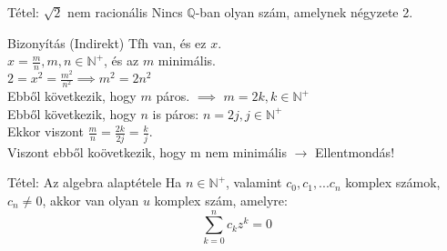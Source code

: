 \documentclass{beamer}
\begin{document}
\begin{frame}

\begin{block}{Tétel: $\sqrt{2}$ nem racionális}
Nincs $\mathbb{Q}$-ban olyan szám, amelynek négyzete 2.
\end{block}

\begin{block}{Bizonyítás (Indirekt)}
Tfh van, és ez $x$.\\
$x = \frac{m}{n}, m,n \in \mathbb{N}^+$, és az $m$ minimális.\\
$2 = x^2 = \frac{m^2}{n^2} \implies m^2 = 2n^2$\\
Ebből következik, hogy $m$ páros. $\implies$ $m = 2k, k \in \mathbb{N}^+$\\
Ebből következik, hogy $n$ is páros: $n = 2j, j \in \mathbb{N}^+$\\
Ekkor viszont $\frac{m}{n} = \frac{2k}{2j} = \frac{k}{j}$.\\
Viszont ebből koövetkezik, hogy m nem minimális $\rightarrow$ Ellentmondás!

\end{block}
\end{frame}

\begin{frame}

\begin{block}{Tétel: Az algebra alaptétele}
Ha $n \in \mathbb{N}^+$, valamint $c_0, c_1, ... c_n$ komplex számok, $c_n \neq 0$, akkor van olyan $u$ komplex szám, amelyre:\\
$$\sum_{k = 0}^n c_kz^k = 0$$
\end{block}

\end{frame}

\begin{frame}[plain]
\end{frame}
\end{document}
